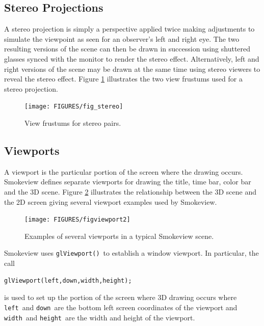 \documentclass[11pt,twoside]{book}
\begin{document}
\subsection{Stereo Projections}

A stereo projection is simply a perspective applied twice making adjustments to simulate the viewpoint as seen for an observer's left and right eye.  The two resulting versions of the scene can then be drawn in succession using shuttered glasses synced with the monitor to render the stereo effect.  Alternatively, left and right versions of the scene may be drawn at the same time using stereo viewers to reveal the stereo effect.  Figure \ref{figstereo} illustrates the two view frustums used for a stereo projection.

\begin{figure}[\figoptions]
\begin{center}
\texttt{[image: FIGURES/fig\_stereo]}
\end{center}
\caption{View frustums for stereo pairs.}
 \label{figstereo}
\end{figure}

\subsection{Viewports}
A viewport is the particular portion of the screen where the
drawing occurs.  Smokeview defines separate viewports for drawing
the title, time bar, color bar and the 3D scene.  Figure
\ref{figviewports} illustrates the relationship between the 3D
scene and the 2D screen giving several viewport examples used by
Smokeview.
\begin{figure}[\figoptions]
\begin{center}
\texttt{[image: FIGURES/figviewport2]}
\end{center}
\caption{Examples of several viewports in a typical Smokeview scene.}
 \label{figviewports}
\end{figure}

Smokeview uses {\tt glViewport()}\ to establish a window viewport.  In particular, the call
\begin{lstlisting}
glViewport(left,down,width,height);
\end{lstlisting}
is used to set up the portion of the screen where 3D drawing occurs where {\tt left}\
and {\tt down}\ are the bottom left screen coordinates of the viewport and {\tt width}\
and {\tt height}\ are the width and height of the viewport.

%
%
\end{document}
